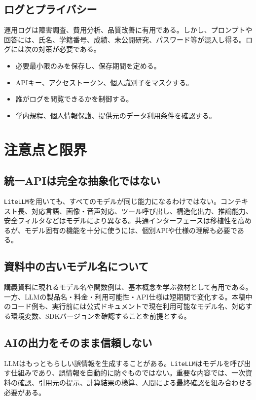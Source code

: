 \documentclass[11pt,a4paper]{bxjsarticle}
\newcommand{\litellm}{\texttt{LiteLLM}}
\begin{document}
\subsection{ログとプライバシー}
運用ログは障害調査、費用分析、品質改善に有用である。しかし、プロンプトや回答には、氏名、学籍番号、成績、未公開研究、パスワード等が混入し得る。ログには次の対策が必要である。
\begin{itemize}
  \item 必要最小限のみを保存し、保存期間を定める。
  \item APIキー、アクセストークン、個人識別子をマスクする。
  \item 誰がログを閲覧できるかを制御する。
  \item 学内規程、個人情報保護、提供元のデータ利用条件を確認する。
\end{itemize}

\section{注意点と限界}
\subsection{統一APIは完全な抽象化ではない}
\litellm{}を用いても、すべてのモデルが同じ能力になるわけではない。コンテキスト長、対応言語、画像・音声対応、ツール呼び出し、構造化出力、推論能力、安全フィルタなどはモデルにより異なる。共通インターフェースは移植性を高めるが、モデル固有の機能を十分に使うには、個別APIや仕様の理解も必要である。

\subsection{資料中の古いモデル名について}
講義資料に現れるモデル名や関数例は、基本概念を学ぶ教材として有用である。一方、LLMの製品名・料金・利用可能性・API仕様は短期間で変化する。本稿中のコード例も、実行前には公式ドキュメントで現在利用可能なモデル名、対応する環境変数、SDKバージョンを確認することを前提とする。

\subsection{AIの出力をそのまま信頼しない}
LLMはもっともらしい誤情報を生成することがある。\litellm{}はモデルを呼び出す仕組みであり、誤情報を自動的に防ぐものではない。重要な内容では、一次資料の確認、引用元の提示、計算結果の検算、人間による最終確認を組み合わせる必要がある。
\end{document}

